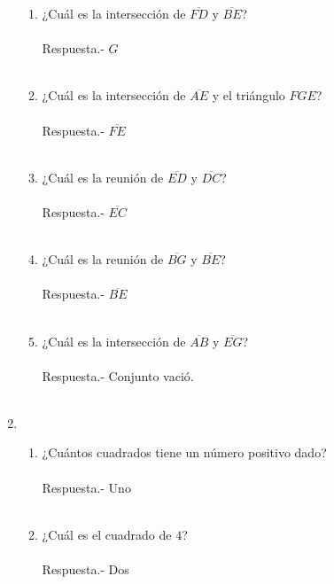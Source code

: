 \begin{enumerate}
\begin{enumerate}[\bfseries (a)]
\item ¿Cuál es la intersección de $\overline{FD}$ y $\overline{BE}$?\\\\
Respuesta.- \; $G$\\\\

\item ¿Cuál es la intersección de $\overline{AE}$ y el triángulo $FGE$?\\\\
Respuesta.- \; $\overline{FE}$\\\\

\item ¿Cuál es la reunión de $\overline{ED}$ y $\overline{DC}$?\\\\
Respuesta.- \; $\overline{EC}$\\\\

\item ¿Cuál es la reunión de $\overline{BG}$ y $\overline{BE}$?\\\\
Respuesta.- \; $\overline{BE}$\\\\

\item ¿Cuál es la intersección de $\overline{AB}$ y $\overline{EG}$?\\\\
Respuesta.- \; Conjunto vació.\\\\
\end{enumerate}

\item 
\begin{enumerate}[\bfseries (a)]
\item ¿Cuántos cuadrados tiene un número positivo dado?\\\\
Respuesta.- \; Uno\\\\ 

\item ¿Cuál es el cuadrado de $4$?\\\\
Respuesta.- \; Dos\\\\


\end{enumerate}
\end{enumerate}
